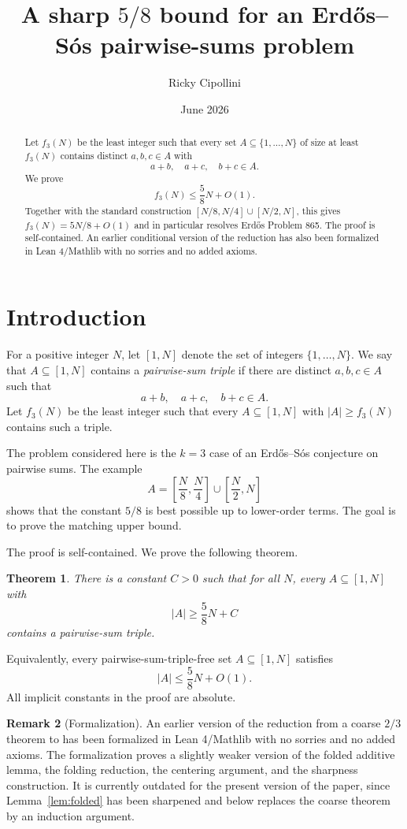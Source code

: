 \documentclass[11pt]{amsart}
\title[A sharp $5/8$ bound for Erd\H{o}s 865]{A sharp $5/8$ bound for an Erd\H{o}s--S\'{o}s pairwise-sums problem}
\author{Ricky Cipollini}
\date{June 2026}
\newtheorem{theorem}{Theorem}[section]
\theoremstyle{definition}
\newtheorem{remark}[theorem]{Remark}
\begin{document}
\begin{abstract}
Let $f_3(N)$ be the least integer such that every set $A\subseteq \{1,\ldots,N\}$ of size at least $f_3(N)$ contains distinct $a,b,c\in A$ with
\[
  a+b,\quad a+c,\quad b+c\in A.
\]
We prove
\[
  f_3(N)\leq \frac58 N+O(1).
\]
Together with the standard construction $[N/8,N/4]\cup [N/2,N]$, this gives $f_3(N)=5N/8+O(1)$ and in particular resolves Erd\H{o}s Problem 865. The proof is self-contained. An earlier conditional version of the reduction has also been formalized in Lean 4/Mathlib with no sorries and no added axioms.
\end{abstract}

\maketitle

\section{Introduction}

For a positive integer $N$, let $[1,N]$ denote the set of integers $\{1,\ldots,N\}$. We say that $A\subseteq [1,N]$ contains a \emph{pairwise-sum triple} if there are distinct $a,b,c\in A$ such that
\[
  a+b,\quad a+c,\quad b+c \in A.
\]
Let $f_3(N)$ be the least integer such that every $A\subseteq[1,N]$ with $|A|\geq f_3(N)$ contains such a triple.

The problem considered here is the $k=3$ case of an Erd\H{o}s--S\'{o}s conjecture on pairwise sums. The example
\[
  A=\left[\frac N8,\frac N4\right]\cup\left[\frac N2,N\right]
\]
shows that the constant $5/8$ is best possible up to lower-order terms. The goal is to prove the matching upper bound.

The proof is self-contained. We prove the following theorem.

\begin{theorem}\label{thm:main}
There is a constant $C>0$ such that for all $N$, every $A\subseteq[1,N]$ with
\[
  |A|\geq \frac58N+C
\]
contains a pairwise-sum triple.
\end{theorem}

Equivalently, every pairwise-sum-triple-free set $A\subseteq[1,N]$ satisfies
\[
  |A|\leq \frac58N+O(1).
\]
All implicit constants in the proof are absolute.

\begin{remark}[Formalization]
An earlier version of the reduction from a coarse $2/3$ theorem to  has been formalized in Lean 4/Mathlib with no sorries and no added axioms. The formalization proves a slightly weaker version of the folded additive lemma, the folding reduction, the centering argument, and the sharpness construction. It is currently outdated for the present version of the paper, since Lemma~\ref{lem:folded} has been sharpened and  below replaces the coarse theorem by an induction argument.
\end{remark}
\end{document}
